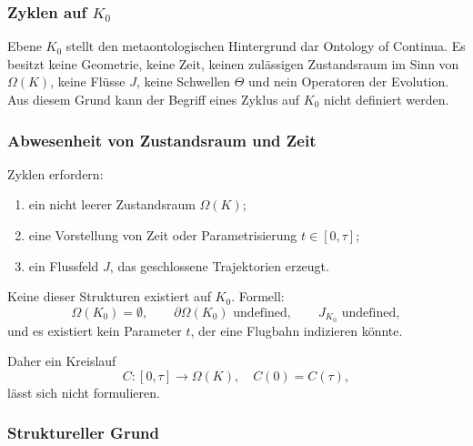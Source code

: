 
\subsubsection{Zyklen auf \texorpdfstring{$K_0$}{K_0}}
\label{sec:cycles-k0}

Ebene $K_0$ stellt den metaontologischen Hintergrund dar
Ontology of Continua.
Es besitzt keine Geometrie, keine Zeit, keinen zulässigen Zustandsraum im
Sinn von $\Omega(K)$, keine Flüsse $J$, keine Schwellen $\Theta$ und nein
Operatoren der Evolution.
Aus diesem Grund kann der Begriff eines Zyklus auf $K_0$ nicht definiert werden.

\subsubsection{Abwesenheit von Zustandsraum und Zeit}

Zyklen erfordern:
\begin{enumerate}
  \item ein nicht leerer Zustandsraum $\Omega(K)$;
  \item eine Vorstellung von Zeit oder Parametrisierung $t\in[0,\tau]$;
  \item ein Flussfeld $J$, das geschlossene Trajektorien erzeugt.
\end{enumerate}

Keine dieser Strukturen existiert auf $K_0$.
Formell:
\[
  \Omega(K_0)=\emptyset, \qquad
  \partial\Omega(K_0) \text{ undefined}, \qquad
  J_{K_0} \text{ undefined},
\]
und es existiert kein Parameter $t$, der eine Flugbahn indizieren könnte.

Daher ein Kreislauf
\[
  C:[0,\tau]\to\Omega(K), \quad C(0)=C(\tau),
\]
lässt sich nicht formulieren.

\subsubsection{Struktureller Grund}

